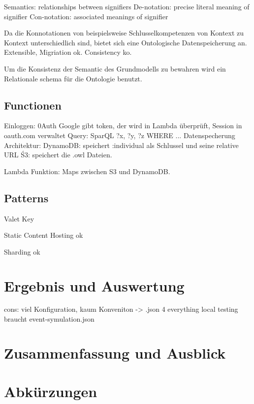 \documentclass[
12pt,
english,
ngerman,
headsepline,
twoside,
openright,
numbers=noenddot,version=first
]{scrreprt}
\begin{document}


Semantics: relationships between signifiers
De-notation: precise literal meaning of signifier
Con-notation: associated meanings of signifier

Da die Konnotationen von beispielsweise Schlusselkompetenzen von Kontext zu Kontext unterschiedlich sind,
bietet sich eine Ontologische Datenspeicherung an. Extensible, Migriation ok. Consistency ko.

Um die Konsistenz der Semantic des Grundmodells zu bewahren wird ein Relationale schema für die Ontologie benutzt.

\section{Functionen}

Einloggen: 0Auth Google gibt token, der wird in Lambda überprüft, Session in oauth.com verwaltet
Query: SparQL ?x, ?y, ?z WHERE ...
Datenspecherung Architektur:
DynamoDB: speichert :individual als Schlussel und seine relative URL
Ś3: speichert die .owl Dateien.

Lambda Funktion: Maps zwischen S3 und DynamoDB.

\section{Patterns}
Valet Key

Static Content Hosting ok

Sharding ok

\chapter{Ergebnis und Auswertung}

cons:
viel Konfiguration, kaum Konveniton -> .json 4 everything
local testing braucht event-symulation.json


\chapter{Zusammenfassung und Ausblick}

\lstlistoflistings

\listoffigures

\chapter*{Abkürzungen}
\end{document}

